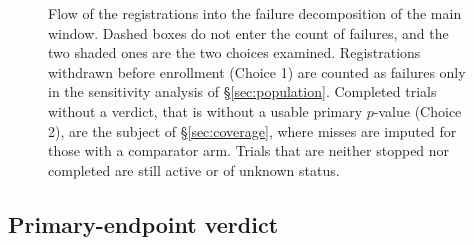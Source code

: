 \documentclass[11pt]{article}
\begin{document}
\begin{figure}[htbp]
\centering

\caption{Flow of the registrations into the failure decomposition of the main window. Dashed boxes do not enter the count of failures, and the two shaded ones are the two choices examined. Registrations withdrawn before enrollment (Choice 1) are counted as failures only in the sensitivity analysis of \S\ref{sec:population}. Completed trials without a verdict, that is without a usable primary $p$-value (Choice 2), are the subject of \S\ref{sec:coverage}, where misses are imputed for those with a comparator arm. Trials that are neither stopped nor completed are still active or of unknown status.}
\label{fig:flow}
\end{figure}

\subsection{Primary-endpoint verdict}\label{sec:verdict}
\end{document}
